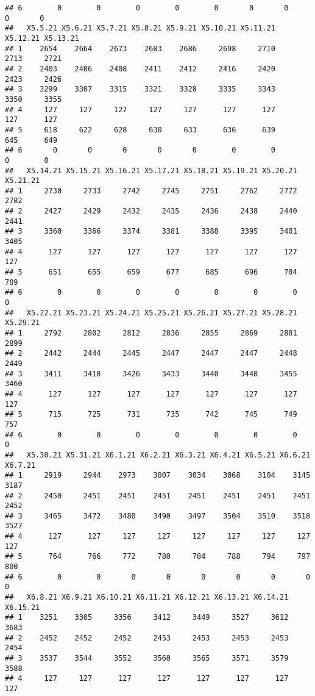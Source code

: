\documentclass[
]{article}
\begin{document}
\begin{verbatim}
## 6        0        0        0        0        0       0       0       0       0
##   X5.5.21 X5.6.21 X5.7.21 X5.8.21 X5.9.21 X5.10.21 X5.11.21 X5.12.21 X5.13.21
## 1    2654    2664    2673    2683    2686     2698     2710     2713     2721
## 2    2403    2406    2408    2411    2412     2416     2420     2423     2426
## 3    3299    3307    3315    3321    3328     3335     3343     3350     3355
## 4     127     127     127     127     127      127      127      127      127
## 5     618     622     628     630     633      636      639      645      649
## 6       0       0       0       0       0        0        0        0        0
##   X5.14.21 X5.15.21 X5.16.21 X5.17.21 X5.18.21 X5.19.21 X5.20.21 X5.21.21
## 1     2730     2733     2742     2745     2751     2762     2772     2782
## 2     2427     2429     2432     2435     2436     2438     2440     2441
## 3     3360     3366     3374     3381     3388     3395     3401     3405
## 4      127      127      127      127      127      127      127      127
## 5      651      655      659      677      685      696      704      709
## 6        0        0        0        0        0        0        0        0
##   X5.22.21 X5.23.21 X5.24.21 X5.25.21 X5.26.21 X5.27.21 X5.28.21 X5.29.21
## 1     2792     2802     2812     2836     2855     2869     2881     2899
## 2     2442     2444     2445     2447     2447     2447     2448     2449
## 3     3411     3418     3426     3433     3440     3448     3455     3460
## 4      127      127      127      127      127      127      127      127
## 5      715      725      731      735      742      745      749      757
## 6        0        0        0        0        0        0        0        0
##   X5.30.21 X5.31.21 X6.1.21 X6.2.21 X6.3.21 X6.4.21 X6.5.21 X6.6.21 X6.7.21
## 1     2919     2944    2973    3007    3034    3068    3104    3145    3187
## 2     2450     2451    2451    2451    2451    2451    2451    2451    2452
## 3     3465     3472    3480    3490    3497    3504    3510    3518    3527
## 4      127      127     127     127     127     127     127     127     127
## 5      764      766     772     780     784     788     794     797     800
## 6        0        0       0       0       0       0       0       0       0
##   X6.8.21 X6.9.21 X6.10.21 X6.11.21 X6.12.21 X6.13.21 X6.14.21 X6.15.21
## 1    3251    3305     3356     3412     3449     3527     3612     3683
## 2    2452    2452     2452     2453     2453     2453     2453     2454
## 3    3537    3544     3552     3560     3565     3571     3579     3588
## 4     127     127      127      127      127      127      127      127

\end{verbatim}
\end{document}
